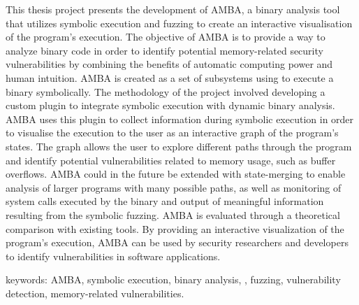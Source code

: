 
This thesis project presents the development of AMBA, a binary analysis
tool that utilizes symbolic execution and fuzzing to create an interactive
visualisation of the program's execution. The objective of AMBA is to provide
a way to analyze binary code in order to identify potential memory-related security
vulnerabilities by combining the benefits of automatic computing power and
human intuition. AMBA is created as a set of subsystems using \stoe{} to
execute a binary symbolically. The methodology of the project involved
developing a custom \stoe{} plugin to integrate symbolic execution with
dynamic binary analysis. AMBA uses this plugin to collect information during
symbolic execution in order to visualise the execution to the user as an
interactive graph of the program's states. The graph allows the user to explore 
different paths through the program and identify potential vulnerabilities 
related to memory usage, such as buffer overflows. AMBA could in the future  
be extended with state-merging to enable analysis of larger programs with 
many possible paths, as well as monitoring of system calls executed by the binary and 
output of meaningful information resulting from the symbolic fuzzing. AMBA 
is evaluated through a theoretical comparison with existing tools. By providing 
an interactive visualization of the program's execution, AMBA can be used by 
security researchers and developers to identify vulnerabilities in 
software applications.


keywords: AMBA, symbolic execution, binary analysis, \stoe{},
fuzzing, vulnerability detection, memory-related vulnerabilities.